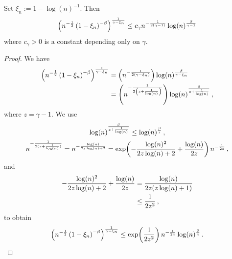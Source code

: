%
\begin{lemma}\label{lmm:seqbound}
	Set $\xi_n := 1 - \log(n)^{-1}$. Then
	\begin{equation*}
		\left( n^{-\frac12} \left( 1-\xi_n \right)^{-\beta} \right)^{\frac{1}{\gamma-\xi_n}} 
		\leq
		c_\gamma n^{-\frac1{2(\gamma-1)}} \log(n)^{\frac{\beta}{\gamma-1}}
	\end{equation*}
	where $c_\gamma > 0$ is a constant depending only on $\gamma$.
\end{lemma}
%
\begin{proof}
	We have
	\begin{align*}
		\left( n^{-\frac12} \left( 1-\xi_n \right)^{-\beta} \right)^{\frac{1}{\gamma-\xi_n}} 
		&= 
		\left( n^{-\frac{1}{2(\gamma-\xi_n)}} \right) \log(n)^{\frac{\beta}{\gamma-\xi_n}} 
		\\&= 
		\left( n^{-\frac{1}{2\left( z+\frac1{\log(n)} \right)}} \right) \log(n)^{\frac{\beta}{z+\frac1{\log(n)}}} 
		\, ,
	\end{align*}
	where $z = \gamma-1$. We use
	\begin{equation*}
		\log(n)^{\frac{\beta}{z+\frac1{\log(n)}}} 
		\leq
		\log(n)^{\frac{\beta}{z}}
		\, ,
	\end{equation*}
	\begin{equation*}
		n^{-\frac{1}{2(z+\frac1{\log(n)})}}
		=
		n^{-\frac{\log(n)}{2z\log(n)+2}}
		=
		\exp\!\left( -\frac{\log(n)^2}{2z\log(n)+2}+\frac{\log(n)}{2z} \right) n^{-\frac1{2z}}
		\, ,
	\end{equation*}
	and
	\begin{align*}
		-\frac{\log(n)^2}{2z\log(n)+2}+\frac{\log(n)}{2z}
		&=
		\frac{\log(n)}{2z (z\log(n)+1)}
		\\&\leq
		\frac1{2z^2}
		\, ,
	\end{align*}
	to obtain
	\begin{equation*}
		\left( n^{-\frac12} \left( 1-\xi_n \right)^{-\beta} \right)^{\frac{1}{\gamma-\xi_n}} 
		\leq
		\exp\!\left( \frac1{2z^2} \right) n^{-\frac1{2z}} \log(n)^{\frac{\beta}{z}}
		\, .
	\end{equation*}
\end{proof}
%
